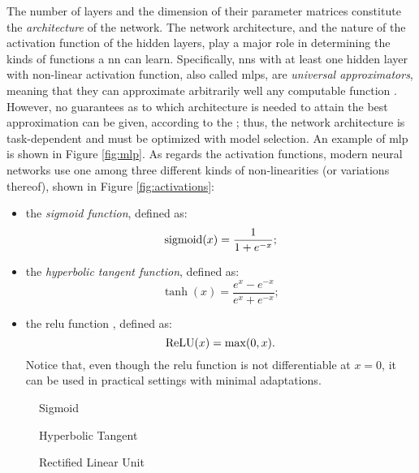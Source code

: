 The number of layers and the dimension of their parameter matrices constitute the \emph{architecture} of the network. The network architecture, and the nature of the activation function of the hidden layers, play a major role in determining the kinds of functions a \gls{nn} can learn. Specifically, \glspl{nn} with at least one hidden layer with non-linear activation function, also called \glspl{mlp}, are \emph{universal approximators}, meaning that they can approximate arbitrarily well any computable function \citep{cybenko1998approximationuniversal}. However, no guarantees as to which architecture is needed to attain the best approximation can be given, according to the  \citep{wolpert1997freelunchtheorem}; thus, the network architecture is task-dependent and must be optimized with model selection. An example of \gls{mlp} is shown in Figure \ref{fig:mlp}. As regards the activation functions, modern neural networks use one among three different kinds of non-linearities (or variations thereof), shown in Figure \ref{fig:activations}:
\begin{itemize}
    \item the \emph{sigmoid function}, defined as:
    $$\operatorname{sigmoid}(x) = \frac{1}{1 + e^{-x}};$$
    \item the \emph{hyperbolic tangent function}, defined as:
    $$\tanh(x) = \frac{e^x - e^{-x}}{e^x + e^{-x}};$$
    \item the \gls{relu} function \citep{glorot2011relu}, defined as:
    $$\operatorname{ReLU}(x) = \max(0, x).$$
    Notice that, even though the \gls{relu} function is not differentiable at $x = 0$, it can be used in practical settings with minimal adaptations.
\end{itemize}
\begin{figure*}[h!]
    \begin{subfigure}[b]{0.32\linewidth}
        \centering
        \resizebox{.8\textwidth}{!}{}
        \caption{Sigmoid}
        \label{fig:sigmoid}
    \end{subfigure}
    \begin{subfigure}[b]{0.32\linewidth}
        \centering
        \resizebox{.8\textwidth}{!}{}
        \caption{Hyperbolic Tangent}
        \label{fig:hyptan}
    \end{subfigure}
    \begin{subfigure}[b]{0.32\linewidth}
        \centering
        \resizebox{.8\textwidth}{!}{}
        \caption{Rectified Linear Unit}
        \label{fig:relu}
    \end{subfigure}
    \caption{Examples of activation functions for the hidden layers (solid line) and their derivatives (dashed line).}
    \label{fig:activations}
\end{figure*}
